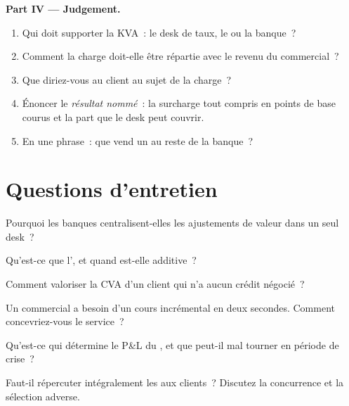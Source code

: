 \begin{problem}
\medskip\noindent\textbf{Part IV --- Judgement.}
\begin{enumerate}[resume]
\item Qui doit supporter la KVA~: le desk de taux, le  ou la banque~?
\item Comment la charge doit-elle être répartie avec le revenu du commercial~?
\item Que diriez-vous au client au sujet de la charge~?
\item Énoncer le \emph{résultat nommé}~: la surcharge tout compris en points de base courus et la part que le desk
peut couvrir.
\item En une phrase~: que vend un  au reste de la banque~?
\end{enumerate}
\end{problem}

\section{Questions d'entretien}

\begin{interviewq}\label{iq:rc:the-valuation-adjustment-desk:1}
Pourquoi les banques centralisent-elles les ajustements de valeur dans un seul desk~?
\end{interviewq}

\begin{interviewq}\label{iq:rc:the-valuation-adjustment-desk:2}
Qu'est-ce que l', et quand est-elle additive~?
\end{interviewq}

\begin{interviewq}\label{iq:rc:the-valuation-adjustment-desk:3}
Comment valoriser la CVA d'un client qui n'a aucun crédit négocié~?
\end{interviewq}

\begin{interviewq}\label{iq:rc:the-valuation-adjustment-desk:4}
Un commercial a besoin d'un cours  incrémental en deux secondes. Comment concevriez-vous le service~?
\end{interviewq}

\begin{interviewq}\label{iq:rc:the-valuation-adjustment-desk:5}
Qu'est-ce qui détermine le P\&L du , et que peut-il mal tourner en période de crise~?
\end{interviewq}

\begin{interviewq}\label{iq:rc:the-valuation-adjustment-desk:6}
Faut-il répercuter intégralement les  aux clients~? Discutez la concurrence et la sélection adverse.
\end{interviewq}
